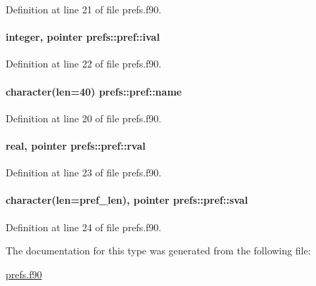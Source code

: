 Definition at line 21 of file prefs.\-f90.

\hypertarget{structprefs_1_1pref_a2d1743633856795fc8eef1b5587c73e9}{
\paragraph[{ival}]{\setlength{\rightskip}{0pt plus 5cm}integer, pointer prefs\-::pref\-::ival\hspace{0.3cm}{\ttfamily [private]}}}\label{structprefs_1_1pref_a2d1743633856795fc8eef1b5587c73e9}


Definition at line 22 of file prefs.\-f90.

\hypertarget{structprefs_1_1pref_ac61a79b96d08a6af61563f2304ad2bd0}{
\paragraph[{name}]{\setlength{\rightskip}{0pt plus 5cm}character(len=40) prefs\-::pref\-::name\hspace{0.3cm}{\ttfamily [private]}}}\label{structprefs_1_1pref_ac61a79b96d08a6af61563f2304ad2bd0}


Definition at line 20 of file prefs.\-f90.

\hypertarget{structprefs_1_1pref_a58e211e8c4ae44b8827aa94a1756f83a}{
\paragraph[{rval}]{\setlength{\rightskip}{0pt plus 5cm}real, pointer prefs\-::pref\-::rval\hspace{0.3cm}{\ttfamily [private]}}}\label{structprefs_1_1pref_a58e211e8c4ae44b8827aa94a1756f83a}


Definition at line 23 of file prefs.\-f90.

\hypertarget{structprefs_1_1pref_a50fa4941c43361d7953f99ae166954ee}{
\paragraph[{sval}]{\setlength{\rightskip}{0pt plus 5cm}character(len={\bf pref\-\_\-len}), pointer prefs\-::pref\-::sval\hspace{0.3cm}{\ttfamily [private]}}}\label{structprefs_1_1pref_a50fa4941c43361d7953f99ae166954ee}


Definition at line 24 of file prefs.\-f90.



The documentation for this type was generated from the following file\-:\begin{DoxyCompactItemize}
\item 
\hyperlink{prefs_8f90}{prefs.\-f90}\end{DoxyCompactItemize}
